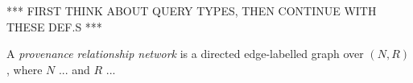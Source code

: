 \documentclass[11pt,DIV=11,a4paper]{scrartcl}
\begin{document}
  *** FIRST THINK ABOUT QUERY TYPES, THEN CONTINUE WITH THESE DEF.S ***
  
  
  A \emph{provenance relationship network} is a directed edge-labelled graph over $(N,R)$,
  where $N$ ... and $R$ ... 
  
     


%  
%  
\end{document}
